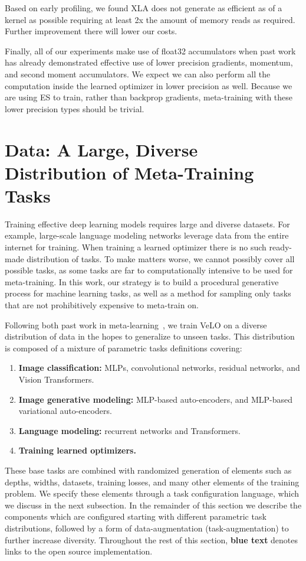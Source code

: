 \documentclass[11pt]{article}
\begin{document}
Based on early profiling, we found XLA does not generate as efficient as of a kernel as possible requiring at least 2x the amount of memory reads as required. Further improvement there will lower our costs.

Finally, all of our experiments make use of float32 accumulators when past work has already demonstrated effective use of lower precision gradients, momentum, and second moment accumulators.
We expect we can also perform all the computation inside the learned optimizer in lower precision as well.
Because we are using ES to train, rather than backprop gradients, meta-training with these lower precision types should be trivial.

\section{Data: A Large, Diverse Distribution of Meta-Training Tasks}
\label{app:opt_benchmark}
Training effective deep learning models requires large and diverse datasets. 
For example, large-scale language modeling networks leverage data from the entire internet for training. 
When training a learned optimizer there is no such ready-made distribution of tasks. 
To make matters worse, we cannot possibly cover all possible tasks, as some tasks are far to computationally intensive to be used for meta-training. 
In this work, our strategy is to build a procedural generative process for machine learning tasks, as well as a method for sampling only tasks that are not prohibitively expensive to meta-train on.

Following both past work in meta-learning~\citep{wichrowska2017learned, metz2020tasks}, we train VeLO on a diverse distribution of data in the hopes to generalize to unseen tasks.
This distribution is composed of a mixture of parametric tasks definitions covering:
\begin{enumerate}
    \item \textbf{Image classification:} MLPs, convolutional networks, residual networks, and Vision Transformers.
    \item \textbf{Image generative modeling:} MLP-based auto-encoders, and MLP-based variational auto-encoders.
    \item \textbf{Language modeling:} recurrent networks and Transformers.
    \item \textbf{Training learned optimizers.}
\end{enumerate}
These base tasks are combined with randomized generation of elements such as depths, widths, datasets, training losses, and many other elements of the training problem.
We specify these elements through a task configuration language, which we discuss in the next subsection. 
In the remainder of this section we describe the components which are configured starting with different parametric task distributions, followed by a form of data-augmentation (task-augmentation) to further increase diversity.
Throughout the rest of this section, {\color{blue} \textbf{blue text}} denotes links to the open source implementation.
\end{document}
